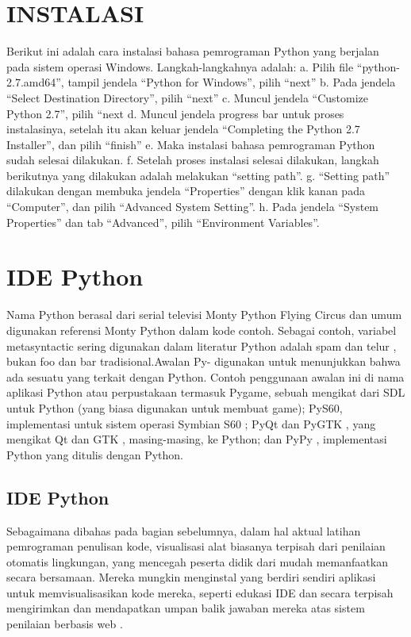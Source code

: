 \section{INSTALASI}
Berikut ini adalah cara instalasi bahasa pemrograman Python yang berjalan pada sistem operasi Windows. Langkah-langkahnya adalah: 
a. Pilih file “python-2.7.amd64”, tampil jendela “Python for Windows”, pilih “next” 
b. Pada jendela “Select Destination Directory”, pilih “next”
 c. Muncul jendela “Customize Python 2.7”, pilih “next
 d. Muncul jendela progress bar untuk proses instalasinya, setelah itu akan keluar jendela “Completing the Python 2.7 Installer”, dan pilih “finish” 
 e. Maka instalasi bahasa pemrograman Python sudah selesai dilakukan. 
 f. Setelah proses instalasi selesai dilakukan, langkah berikutnya yang dilakukan adalah melakukan “setting path”. 
 g. “Setting path” dilakukan dengan membuka jendela “Properties” dengan klik kanan pada “Computer”, dan pilih “Advanced System Setting”. 
 h. Pada jendela “System Properties” dan tab “Advanced”, pilih “Environment Variables”\citep{wicaksana2013user}.

\section{IDE Python}
Nama Python berasal dari serial televisi Monty Python Flying Circus dan umum digunakan referensi Monty Python dalam kode contoh. Sebagai contoh, variabel metasyntactic sering digunakan dalam literatur Python adalah spam dan telur , bukan foo dan bar tradisional.Awalan Py- digunakan untuk menunjukkan bahwa ada sesuatu yang terkait dengan Python. Contoh penggunaan awalan ini di nama aplikasi Python atau perpustakaan termasuk Pygame, sebuah mengikat dari SDL untuk Python (yang biasa digunakan untuk membuat game); PyS60, implementasi untuk sistem operasi Symbian S60 ; PyQt dan PyGTK , yang mengikat Qt dan GTK , masing-masing, ke Python; dan PyPy , implementasi Python yang ditulis dengan Python. \cite{van2007python}

\subsection{IDE Python}
Sebagaimana dibahas pada bagian sebelumnya, dalam hal aktual latihan pemrograman penulisan kode, visualisasi alat biasanya terpisah dari penilaian otomatis lingkungan, yang mencegah peserta didik dari mudah memanfaatkan secara bersamaan. Mereka mungkin menginstal yang berdiri sendiri aplikasi untuk memvisualisasikan kode mereka, seperti edukasi IDE dan secara terpisah mengirimkan dan mendapatkan umpan balik jawaban mereka atas sistem penilaian berbasis web \cite{helminen2010jype}.

